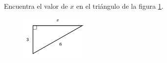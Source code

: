 \question[15]  Encuentra el valor de $x$ en el triángulo de la figura \ref{fig:lados_pitagoras_33}.
\begin{figure}[H]
    \begin{center}
        \includegraphics[width=0.3\textwidth]{../images/lados_pitagoras_33.png}
    \end{center}
    \caption{}
    \label{fig:lados_pitagoras_33}
\end{figure}